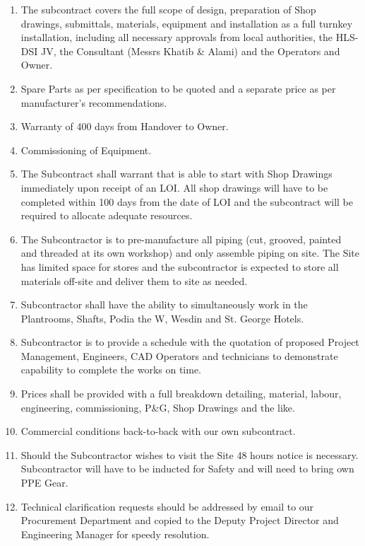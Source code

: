 \documentclass[a4paper,11pt,oneside]{article}
\def\signature{%
 \YL\encl}
\begin{document}
\begin{enumerate}
\item The subcontract covers the full scope of design, preparation of Shop drawings, submittals, materials, equipment and installation as a full turnkey installation, including all necessary approvals from local authorities, the HLS-DSI JV, the Consultant (Messrs Khatib \& Alami) and the Operators and Owner.

\item Spare Parts as per specification to be quoted and a separate price as per manufacturer's recommendations.
\item Warranty of 400 days from Handover to Owner.
\item Commissioning of Equipment.
\item The Subcontract shall warrant that is able to start with Shop Drawings immediately upon receipt of an LOI. All shop drawings will have to be completed within 100 days from the date of LOI and the subcontract will be required to allocate adequate resources.
\item The Subcontractor is to pre-manufacture all piping (cut, grooved, painted and threaded at its own workshop) and only assemble piping on site. The Site has limited space for stores and the subcontractor is expected to store all materials off-site and deliver them to site as needed.
\item Subcontractor shall have the ability to simultaneously work in the Plantrooms, Shafts, Podia the W, Wesdin and St. George Hotels. 
\item Subcontractor is to provide a schedule with the quotation of proposed Project Management, Engineers, CAD Operators and technicians to demonstrate capability to complete the works on time.
\item Prices shall be provided with a full breakdown detailing, material, labour, engineering, commissioning, P\&G, Shop Drawings and the like.
\item Commercial conditions back-to-back with our own subcontract.
\item Should the Subcontractor wishes to visit the Site 48 hours notice is necessary. Subcontractor will have to be inducted for Safety and will need to bring own PPE Gear.
\item Technical clarification requests should be addressed by email to our Procurement Department and copied to the Deputy Project Director and Engineering Manager for speedy resolution.

\end{enumerate}



\signature
\end{document}
